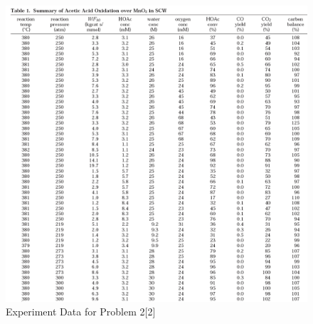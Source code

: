 \documentclass[12pt]{article} %
\begin{document}
\begin{figure}[ht]
    \centering
    \includegraphics[width=1\textwidth]{Q2_data.png}
    \caption{Experiment Data for Problem 2[2]}
\end{figure}
\end{document}
